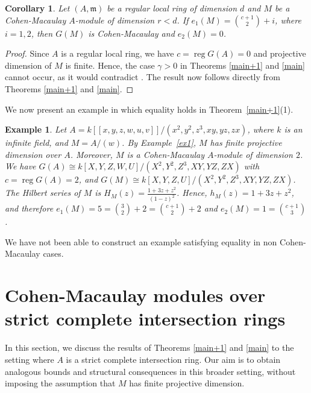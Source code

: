 \documentclass[11pt]{amsart}
\theoremstyle{plain}
\newtheorem{corollary}[theorem]{Corollary}
\newtheorem{example}[theorem]{Example}
\newcommand{\m}{\mathfrak{m}}
\newcommand{\reg}{\operatorname{reg}}
\theoremstyle{plain}
\begin{document}
\begin{corollary}\label{reg2}
     Let $(A,\m)$ be a regular local ring of dimension $d$ and $M$ be a Cohen-Macaulay $A$-module of dimension $r<d$. If $e_1(M)=\binom{c+1}{2}+i$, where $i=1,2$, then $G(M)$ is Cohen-Macaulay and $e_2(M)=0$. 
\end{corollary}
\begin{proof}
Since $A$ is a regular local ring, we have $c=\reg G(A)=0$ and projective dimension of $M$ is finite. Hence, the case $\gamma>0$ in Theorems \ref{main+1} and \ref{main} cannot occur, as it would contradict \cite[Proposition 3.1]{rossi2010hilbert}. The result now follows directly from Theorems \ref{main+1} and \ref{main}.
\end{proof}






We now present an example in which equality holds in Theorem~\ref{main+1}(1). 

\begin{example}
\normalfont
Let $A=k[[x,y,z,w,u,v]]/(x^2,y^2,z^3,xy,yz,zx)$, where $k$ is an infinite field, and $M=A/(w)$. By Example~\ref{ex1}, $M$ has finite projective dimension over $A$. Moreover, $M$ is a Cohen-Macaulay $A$-module of dimension $2$. We have $G(A)\cong k[X,Y,Z,W,U]/(X^2,Y^2,Z^3,XY,YZ,ZX)$ with $c=\operatorname{reg} G(A)=2$, and
$G(M)\cong k[X,Y,Z,U]/(X^2,Y^2,Z^3,XY,YZ,ZX)$. The Hilbert series of $M$ is
$\displaystyle H_M(z)=\frac{1+3z+z^2}{(1-z)^2}$. Hence, $h_M(z)=1+3z+z^2$, and therefore
$e_1(M)=5=\binom{3}{2}+2=\binom{c+1}{2}+2$ and
$e_2(M)=1=\binom{c+1}{3}$.

\end{example}

We have not been able to construct an example satisfying equality in non Cohen-Macaulay cases.

















\section{Cohen-Macaulay modules over strict complete intersection rings}
In this section, we discuss the results of Theorems \ref{main+1} and \ref{main} to the setting where $A$ is a strict complete intersection ring. Our aim is to obtain analogous bounds and structural consequences in this broader setting, without imposing the assumption that $M$ has finite projective dimension.
\end{document}
